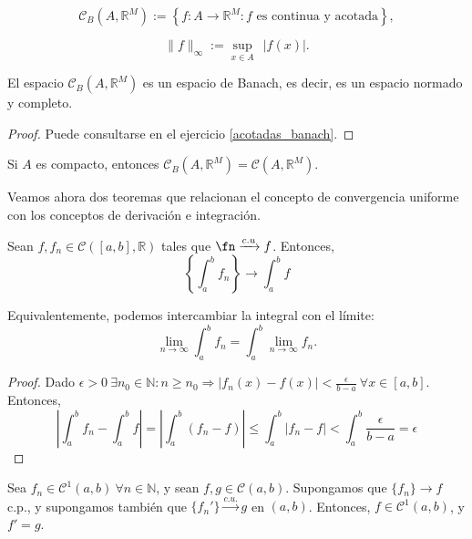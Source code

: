 \[
	\mathcal{C}_B(A,\mathbb{R}^M) := \left\{ f:A \longrightarrow \mathbb{R}^M: \text{$f$ es continua y acotada}\right\},
\]

\[
	\|f\|_{\infty} := \sup_{x\in A} \ \ |f(x)|
.\]

\begin{nprop} El espacio $\mathcal{C}_B(A, \mathbb{R}^M)$ es un espacio de Banach, es decir, es un espacio normado y completo.
\end{nprop}

  \begin{proof}
	  Puede consultarse en el ejercicio \ref{acotadas_banach}.
  \end{proof}


\begin{nota}
  Si $A$ es compacto, entonces  $\mathcal{C}_B(A,\mathbb{R}^M) = \mathcal{C}(A, \mathbb{R}^M)$.
\end{nota}

Veamos ahora dos teoremas que relacionan el concepto de convergencia uniforme con los conceptos de derivación e integración.

\begin{nth} \label{4} Sean $f, f_n \in \mathcal{C}([a,b],\mathbb{R})$ tales que $\fn \xrightarrow {c.u} f$. Entonces, $$\left\{\int_a^b f_n\right\} \rightarrow \int_a^b f $$

  Equivalentemente, podemos intercambiar la integral con el límite: $$\lim_{n\rightarrow \infty} \int_a^b f_n = \int_a^b \lim_{n\rightarrow \infty} f_n.$$
\end{nth}

  \begin{proof} Dado $\displaystyle \epsilon >0\ \exists n_0 \in \mathbb{N}: n \ge n_0 \Rightarrow |f_n(x)-f(x)| < \frac{\epsilon}{b-a}\ \forall x \in [a,b]$. Entonces, $$\left| \int_a^b f_n - \int _a^b f \right| = \left| \int_a^b (f_n - f) \right| \le \int_a^b |f_n - f| < \int_a^b \frac{\epsilon}{b-a} = \epsilon$$
  \end{proof}

\begin{nth} \label{5}
  Sea $f_n\in \mathcal{C}^1(a,b) \ \forall n \in \mathbb{N}$, y sean $f,g \in \mathcal{C}(a,b)$. Supongamos que $ \{f_n\} \to f$ c.p., y supongamos también que $\{f_n'\} \xrightarrow{c.u.} g $ en $(a,b)$. Entonces, $f \in \mathcal{C}^1(a,b)$, y $f' = g$.
\end{nth}

